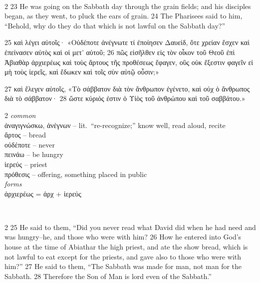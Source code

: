 \documentclass[10pt,a5paper,twoside,twocolumn]{book}
\newcommand*\cleartoleftpage{%
  \ifodd\value{page}\hbox{}\clearpage\fi
}
\newcommand{\separator}{
  \vspace{-0.5\baselineskip}%
  \hspace{0.27\textwidth}%
  \noindent\makebox[\linewidth]{\resizebox{0.3333\linewidth}{1pt}{$\bullet$}}\bigskip%
  \vspace{-0.5\baselineskip}
}
\newenvironment{facing}{\cleartoleftpage}{\clearpage\pagebreak}
\newenvironment{help}{\clearpage}{}
\newenvironment{helpsec}{\begin{minipage}[t]{\textwidth}\begin{multicols}{2}}{\end{multicols}\end{minipage}}
\newenvironment{vocab}{\begin{helpsec}}{\end{helpsec}}
\newenvironment{translation}{\separator\\\begin{helpsec}\footnotesize}{\end{helpsec}}
\begin{document}
\begin{facing}
\begin{help}
\begin{translation}
23 He was going on the Sabbath day through the grain fields; and his disciples began, as they went, to pluck the ears of grain. 24 The Pharisees said to him, ``Behold, why do they do that which is not lawful on the Sabbath day?'' 

\end{translation}
\end{help}
\end{facing}


\begin{facing}
25 καὶ λέγει αὐτοῖς· «Οὐδέποτε ἀνέγνωτε τί ἐποίησεν Δαυείδ, ὅτε χρείαν ἔσχεν καὶ ἐπείνασεν αὐτὸς καὶ οἱ μετ’ αὐτοῦ; 26 πῶς εἰσῆλθεν εἰς τὸν οἶκον τοῦ Θεοῦ ἐπὶ Ἀβιαθὰρ ἀρχιερέως καὶ τοὺς ἄρτους τῆς προθέσεως ἔφαγεν, οὓς οὐκ ἔξεστιν φαγεῖν εἰ μὴ τοὺς ἱερεῖς, καὶ ἔδωκεν καὶ τοῖς σὺν αὐτῷ οὖσιν;»

27 καὶ ἔλεγεν αὐτοῖς, «Τὸ σάββατον διὰ τὸν ἄνθρωπον ἐγένετο, καὶ οὐχ ὁ ἄνθρωπος διὰ τὸ σάββατον· 28 ὥστε κύριός ἐστιν ὁ Υἱὸς τοῦ ἀνθρώπου καὶ τοῦ σαββάτου.»

\begin{help}
\begin{vocab}
\emph{common}\\
ἀναγιγνώσκω, ἀνέγνων  -- lit.~``re-recognize;'' know well, read aloud, recite\\
ἄρτος -- bread\\
οὐδέποτε -- never\\
πεινάω -- be hungry\\
ἱερεύς -- priest\\
πρόθεσις -- offering, something placed in public\\

\emph{forms}\\
ἀρχιερέως = ἀρχ + ἱερεύς\\
\end{vocab}
\begin{translation}
 25 He said to them, ``Did you never read what David did when he had need and was hungry--he, and those who were with him? 26  How he entered into God's house at the time of Abiathar the high priest, and ate the show bread, which is not lawful to eat except for the priests, and gave also to those who were with him?''
27 He said to them, ``The Sabbath was made for man, not man for the Sabbath. 28  Therefore the Son of Man is lord even of the Sabbath.''
\end{translation}
\end{help}
\end{facing}
\end{document}
